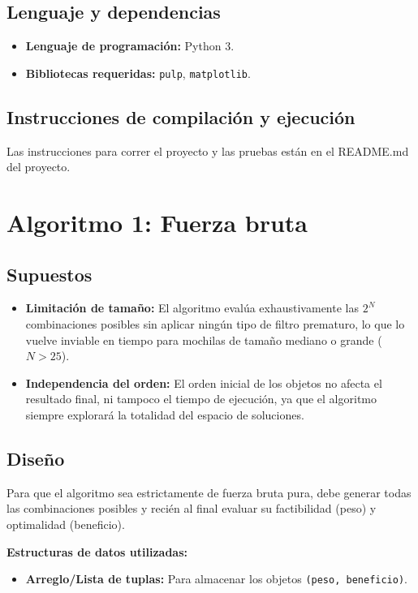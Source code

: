 \documentclass[11pt,a4paper]{article}
\begin{document}
\subsection{Lenguaje y dependencias}
\begin{itemize}
    \item \textbf{Lenguaje de programación:} Python 3.
    \item \textbf{Bibliotecas requeridas:} \texttt{pulp}, \texttt{matplotlib}.
\end{itemize}

\subsection{Instrucciones de compilación y ejecución}
Las instrucciones para correr el proyecto y las pruebas están en el README.md del proyecto.

\newpage

\section{Algoritmo 1: Fuerza bruta}

\subsection{Supuestos}
\begin{itemize}
    \item \textbf{Limitación de tamaño:} El algoritmo evalúa exhaustivamente las $2^N$ combinaciones posibles sin aplicar ningún tipo de filtro prematuro, lo que lo vuelve inviable en tiempo para mochilas de tamaño mediano o grande ($N > 25$).
    \item \textbf{Independencia del orden:} El orden inicial de los objetos no afecta el resultado final, ni tampoco el tiempo de ejecución, ya que el algoritmo siempre explorará la totalidad del espacio de soluciones.
\end{itemize}

\subsection{Diseño}
Para que el algoritmo sea estrictamente de fuerza bruta pura, debe generar todas las combinaciones posibles y recién al final evaluar su factibilidad (peso) y optimalidad (beneficio).

\textbf{Estructuras de datos utilizadas:}
\begin{itemize}
    \item \textbf{Arreglo/Lista de tuplas:} Para almacenar los objetos \texttt{(peso, beneficio)}.
\end{itemize}
\end{document}
